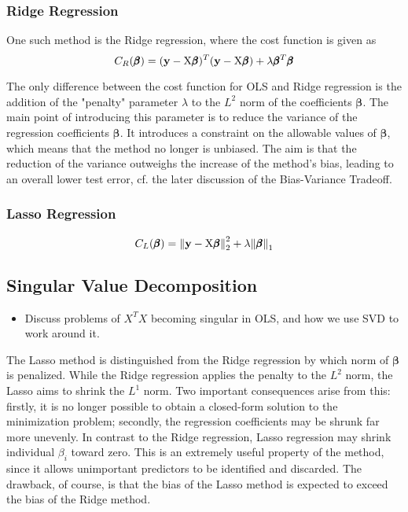 \documentclass[reprint, english, nofootinbib]{revtex4-2}
\begin{document}
        \subsubsection{Ridge Regression}
            One such method is the Ridge regression, where the cost function is given as
            \begin{equation}
                C_{R}(\pmb \beta)
                = (\mathbf y - \textup{X}\pmb\beta)^T(\mathbf y - \textup{X}\pmb\beta)
                + \lambda \pmb\beta^T\pmb\beta
            \end{equation}
			
			The only difference between the cost function for OLS and Ridge regression is the addition of the "penalty" parameter $\lambda$ to the $L^2$ norm of the coefficients $\pmb{\beta}$. The main point of introducing this parameter is to reduce the variance of the regression coefficients $\pmb{\beta}$. It introduces a constraint on the allowable values of $\pmb{\beta}$, which means that the method no longer is unbiased. The aim is that the reduction of the variance outweighs the increase of the method's bias, leading to an overall lower test error, cf. the later discussion of the Bias-Variance Tradeoff.
            
        \subsubsection{Lasso Regression}
            \begin{equation}
                C_L(\pmb \beta) =
                \norm{\mathbf y - \textup{X}\pmb{\beta}}_2^2
                + \lambda\norm{\pmb{\beta}}_1
            \end{equation}
    \subsection{Singular Value Decomposition}
        \begin{itemize}
            \item Discuss problems of $X^T X$ becoming singular in OLS, and how we use SVD to work around it.
        \end{itemize}

	The Lasso method is distinguished from the Ridge regression by which norm of $\pmb{\beta}$ is penalized. While the Ridge regression applies the penalty to the $L^2$ norm, the Lasso aims to shrink the $L^1$ norm. Two important consequences arise from this: firstly, it is no longer possible to obtain a closed-form solution to the minimization problem; secondly, the regression coefficients may be shrunk far more unevenly. In contrast to the Ridge regression, Lasso regression may shrink individual $\beta_{i}$ toward zero. This is an extremely useful property of the method, since it allows unimportant predictors to be identified and discarded. The drawback, of course, is that the bias of the Lasso method is expected to exceed the bias of the Ridge method.
\end{document}
